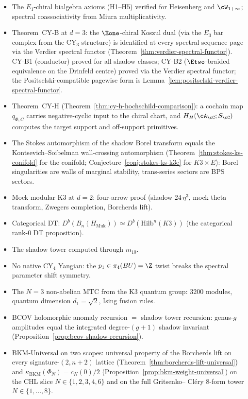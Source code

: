 \begin{itemize}[leftmargin=1.5em,topsep=0.3ex,itemsep=0.2ex]
 $O(\hbar_{\mathrm{Y}}^2)$ for the Yang $R$-matrix; ZTE
 correction matrix~$T$ computed explicitly (exact rational,
 persymmetric), with $\Phi$-level meaning only after the
 Drinfeld-centre half-braiding comparison is supplied.
 \item The $E_1$-chiral bialgebra axioms (H1--H5) verified
 for Heisenberg and $\cW_{1+\infty}$; spectral
 coassociativity from Miura multiplicativity.
 \item Theorem~CY-B at $d = 3$: the $\Eone$-chiral Koszul
 dual (via the $E_3$ bar complex from the CY$_3$ structure)
 is identified at every spectral sequence page via the
 Verdier spectral functor
 (Theorem~\ref{thm:verdier-spectral-functor}). CY-B1
 (conductor) proved for all shadow classes; CY-B2
 ($\Etwo$-braided equivalence on the Drinfeld centre)
 proved via the Verdier spectral functor; the Positselski-compatible
 pagewise form is Lemma~\ref{lem:positselski-verdier-spectral-functor}.
 \item Theorem~CY-H
 (Theorem~\ref{thm:cy-h-hochschild-comparison}): a cochain map
 $q_{\Phi,C}$ carries negative-cyclic input to the chiral chart, and
 $H_H(\cA_\cC;S_\cC)$ computes the target support and off-support
 primitives.
 \item The Stokes automorphism of the shadow Borel transform
 equals the Kontsevich--Soibelman wall-crossing automorphism
 (Theorem~\ref{thm:stokes-ks-conifold} for the conifold;
 Conjecture~\ref{conj:stokes-ks-k3e} for $K3 \times E$):
 Borel singularities are walls of marginal stability,
 trans-series sectors are BPS sectors.
 \item Mock modular K3 at $d = 2$: four-arrow proof (shadow
 $24\,\eta^3$, mock theta transform, Zwegers completion,
 Borcherds lift).
 \item Categorical DT:
 $D^b(B_n(H_{\mathrm{Muk}})) \simeq D^b(\mathrm{Hilb}^n(K3))$
 (the categorical rank-$0$ DT proposition).
 \item The shadow tower computed through $m_{10}$.
 \item No native CY$_4$ Yangian: the $p_1 \in \pi_4(BU) = \Z$
 twist breaks the spectral parameter shift symmetry.
 \item The $N = 3$ non-abelian MTC from the K3 quantum group:
 $3200$ modules, quantum dimension $d_1 = \sqrt{2}$, Ising
 fusion rules.
 \item BCOV holomorphic anomaly recursion $=$ shadow tower
 recursion: genus-$g$ amplitudes equal the integrated
 degree-$(g+1)$ shadow invariant
 (Proposition~\ref{prop:bcov-shadow-recursion}).
 \item BKM-Universal on two scopes: universal property of the
 Borcherds lift on every signature-$(2, n+2)$ lattice
 (Theorem~\ref{thm:borcherds-lift-universal}) and
 $\kappa_{\mathrm{BKM}}(\Phi_N) = c_N(0)/2$
 (Proposition~\ref{prop:bkm-weight-universal}) on the CHL
 slice $N \in \{1, 2, 3, 4, 6\}$ and on the full Gritsenko--
 Cl\'ery 8-form tower $N \in \{1, \ldots, 8\}$.
\end{itemize}

